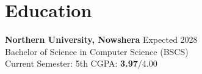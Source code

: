 \section*{Education}

\textbf{Northern University, Nowshera} \hfill Expected 2028\\
Bachelor of Science in Computer Science (BSCS)\\
Current Semester: 5th \hfill CGPA: \textbf{3.97}/4.00